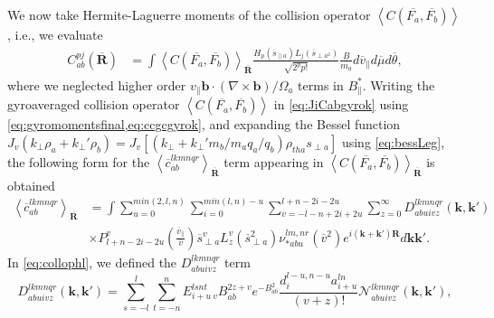 We now take Hermite-Laguerre moments of the collision operator $\left<C(\overline{F_a},\overline{F_b})\right>$, i.e., we evaluate
%
\begin{equation}
\begin{split}
    C_{ab}^{pj}(\overline{\mathbf R})&=\int \left<C(\overline{F_a},\overline{F_b})\right>_{\overline{\mathbf R}} \frac{H_p(\overline s_{\parallel a})L_j(\overline s_{\perp a^2})}{\sqrt{2^p p!}}\frac{B}{m_a}d \overline v_\parallel d \overline \mu d\overline \theta,
\end{split}
\label{eq:collopmoments}
\end{equation}
%
where we neglected higher order $v_\parallel \mathbf b \cdot (\nabla \times \mathbf b)/\Omega_a$ terms in $B_{\parallel}^*$.
%
Writing the gyroaveraged collision operator $\left<C(\overline{F_a},\overline{F_b})\right>$ in \cref{eq:JiCabgyrok} using \cref{eq:gyromomentsfinal,eq:ccgcgyrok}, and expanding the Bessel function $J_{v}(k_\perp \rho_a+k_\perp' \rho_b)=J_{v}[(k_\perp+k_\perp'{m_b/m_a}q_a/q_b)\rho_{tha} s_{\perp a}]$ using \cref{eq:bessLeg}, the following form for the $\left<\overline c_{ab}^{lkmnqr} \right>_{\overline {\mathbf R}}$ term appearing in $\left<C(\overline{F_a},\overline{F_b})\right>_{\overline{\mathbf R}}$ is obtained
%
\begin{align}
    \left<\overline c_{ab}^{lkmnqr} \right>_{\overline {\mathbf R}}&=\int\sum_{u=0}^{min(2,l,n)}\sum_{i=0}^{min(l,n)-u} \sum_{v=-l-n+2i+2u}^{l+n-2i-2u}\sum_{z=0}^\infty D_{abuivz}^{lkmnqr}(\mathbf k, \mathbf k')\nonumber\\
    &\times  P_{l+n-2i-2u}^v\left(\frac{\overline v_\parallel}{\overline v}\right)\overline s_{\perp a}^v L_z^v(\overline s_{\perp a}^2) \nu_{*abu}^{lm,nr}(\overline v^2)e^{i (\mathbf k + \mathbf k')\mathbf R} d\mathbf k \mathbf k'.
\label{eq:collophl}
\end{align}
%
In \cref{eq:collophl}, we defined the $D_{abuivz}^{lkmnqr}$ term
%
\begin{equation}
    D_{abuivz}^{lkmnqr}(\mathbf k, \mathbf k')=\sum_{s=-l}^l \sum_{t=-n}^n E_{i+u~v}^{lsnt} B_{ab}^{2z+v}e^{-B_{ab}^2}\frac{d_i^{l-u,n-u}a_{i+u}^{ln}}{(v+z)!}\mathcal{N}_{abuivz}^{lkmnqr}(\mathbf k, \mathbf k'),
\end{equation}
